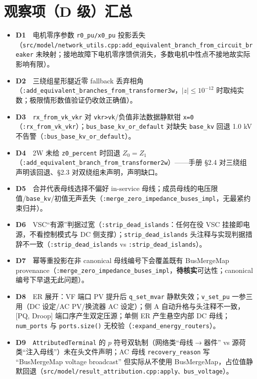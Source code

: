 \documentclass[11pt,a4paper,fontset=fandol]{ctexart}
\newcommand{\file}[1]{\texttt{#1}}
\begin{document}
\section{观察项（D 级）汇总}
\label{sec:obs}

\begin{itemize}
  \item \textbf{D1}　电机零序参数 \texttt{r0\_pu/x0\_pu} 投影丢失（\file{src/model/network\_utils.cpp:add\_equivalent\_branch\_from\_circuit\_breaker} 未映射；接地故障下电机零序馈供消失，多数电机中性点不接地故实际影响有限）。
  \item \textbf{D2}　三绕组星形腿近零 fallback 丢弃相角（\file{:add\_equivalent\_branches\_from\_transformer3w}，$|z|\le10^{-12}$ 时取纯实数；极限情形数值验证仍收敛正确值）。
  \item \textbf{D3}　\file{rx\_from\_vk\_vkr} 对 \texttt{vkr>vk}/负值非法数据静默钳 \texttt{x=0}（\file{:rx\_from\_vk\_vkr}）；\texttt{bus\_base\_kv\_or\_default} 对缺失 \texttt{base\_kv} 回退 1.0 kV 不告警（\file{:bus\_base\_kv\_or\_default}）。
  \item \textbf{D4}　2W 未给 \texttt{z0\_percent} 时回退 $Z_0=Z_1$（\file{:add\_equivalent\_branch\_from\_transformer2w}）——手册 \S 2.4 对三绕组声明该回退、\S 2.3 对双绕组未声明，声明缺口。
  \item \textbf{D5}　合并代表母线选择不偏好 in-service 母线；成员母线的电压限值/\texttt{base\_kv}/初值无声丢失（\file{:merge\_zero\_impedance\_buses\_impl}，无最紧约束归并）。
  \item \textbf{D6}　VSC``有源''判据过宽（\file{:strip\_dead\_islands}：任何在役 VSC 挂接即电源，不看控制模式与 DC 侧支撑）；\file{strip\_dead\_islands} 头注释与实现判据措辞不一致（\file{:strip\_dead\_islands} vs \file{:strip\_dead\_islands}）。
  \item \textbf{D7}　幂等重投影在非 canonical 母线编号下会覆盖既有 BusMergeMap provenance（\file{:merge\_zero\_impedance\_buses\_impl}，\textbf{待核实}可达性；canonical 编号下早退无此问题）。
  \item \textbf{D8}　ER 展开：VF 端口 PV 提升后 \texttt{q\_set\_mvar} 静默失效；\texttt{v\_set\_pu} 一参三用（DC 设定/AC PV/换流器 AC 设定）；侧 A 自动升格与头注释不一致，[PQ, Droop] 端口序产生双定压源；单侧 ER 产生悬空内部 DC 母线；\texttt{num\_ports} 与 \texttt{ports.size()} 无校验（\file{:expand\_energy\_routers}）。
  \item \textbf{D9}　\texttt{AttributedTerminal} 的 $p$ 符号双轨制（网络类``母线$\to$器件'' vs 源荷类``注入母线''）未在头文件声明；AC 母线 \texttt{recovery\_reason} 写 ``BusMergeMap voltage broadcast'' 但实际从不使用 BusMergeMap，占位值静默回退（\file{src/model/result\_attribution.cpp:apply、bus\_voltage}）。

\end{itemize}
\end{document}
